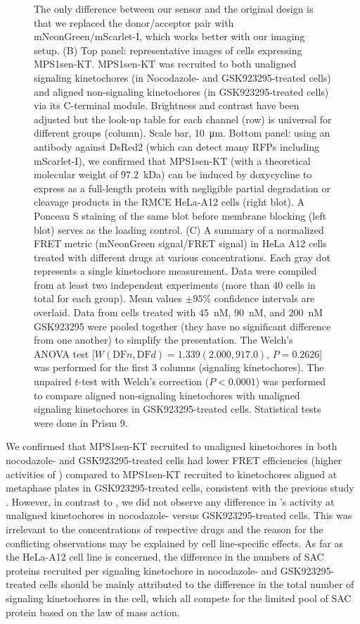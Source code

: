 \begin{figure}
    The only difference between our sensor and the original design \cite{MPS1senor} is that we replaced the donor/acceptor pair with mNeonGreen/mScarlet-I, which works better with our imaging setup. (B) Top panel: representative images of cells expressing MPS1sen-KT. MPS1sen-KT was recruited to both unaligned signaling kinetochores (in Nocodazole- and GSK923295-treated cells) and aligned non-signaling kinetochores (in GSK923295-treated cells) via its C-terminal  module. Brightness and contrast have been adjusted but the look-up table for each channel (row) is universal for different groups (column). Scale bar, \SI{10}{\micro m}. Bottom panel: using an antibody against DsRed2 (which can detect many RFPs including mScarlet-I), we confirmed that MPS1sen-KT (with a theoretical molecular weight of \SI{97.2}{kDa}) can be induced by doxycycline to express as a full-length protein with negligible partial degradation or cleavage products in the RMCE HeLa-A12 cells (right blot). A Ponceau S staining of the same blot before membrane blocking (left blot) serves as the loading control. (C) A summary of a normalized FRET metric (mNeonGreen signal/FRET signal) in HeLa A12 cells treated with different drugs at various concentrations. Each gray dot represents a single kinetochore measurement. Data were compiled from at least two independent experiments (more than 40 cells in total for each group). Mean values $\pm 95\%$ confidence intervals are overlaid. Data from cells treated with \SI{45}{nM}, \SI{90}{nM}, and \SI{200}{nM} GSK923295 were pooled together (they have no significant difference from one another) to simplify the presentation. The Welch's ANOVA test [$W(\text{DF}n, \text{DF}d) = 1.339 (2.000, 917.0)$, $P = 0.2626$] was performed for the first 3 columns (signaling kinetochores). The unpaired $t$-test with Welch's correction ($P < 0.0001$) was performed to compare aligned non-signaling kinetochores with unaligned signaling kinetochores in GSK923295-treated cells. Statistical tests were done in Prism 9.
    \label{MPS1sen-KT}
\end{figure}

We confirmed that MPS1sen-KT recruited to unaligned kinetochores in both nocodazole- and GSK923295-treated cells had lower FRET efficiencies (higher activities of ) compared to MPS1sen-KT recruited to kinetochores aligned at metaphase plates in GSK923295-treated cells, consistent with the previous study \cite{MPS1senor}. However, in contrast to \cite{MPS1senor}, we did not observe any difference in 's activity at unaligned kinetochores in nocodazole- versus GSK923295-treated cells. This was irrelevant to the concentrations of respective drugs and the reason for the conflicting observations may be explained by cell line-specific effects. As far as the HeLa-A12 cell line is concerned, the difference in the numbers of SAC proteins recruited per signaling kinetochore in nocodazole- and GSK923295-treated cells should be mainly attributed to the difference in the total number of signaling kinetochores in the cell, which all compete for the limited pool of SAC protein based on the law of mass action.

